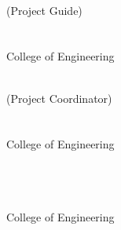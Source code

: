 \begin{singlespace}
	\noindent\begin{minipage}[t]{0.48\textwidth}
		\raggedright
		\textbf{\guide} \\
		(Project Guide) \\
		\guidedes \\
		\deptabbr \\
		College of Engineering \\
		\collegetown
	\end{minipage}%
	\hfill
	\begin{minipage}[t]{0.48\textwidth}
		\raggedright
		\textbf{\coordinator} \\
		(Project Coordinator) \\
		\coordinatordes \\
		\deptabbr \\
		College of Engineering \\
		\collegetown
	\end{minipage}

	\vspace*{0.9cm}

	\begin{center}
		\textbf{\hod} \\
		\hoddes \\
		\deptabbr \\
		College of Engineering \\
		\collegetown
	\end{center}
\end{singlespace}

\thispagestyle{empty}
